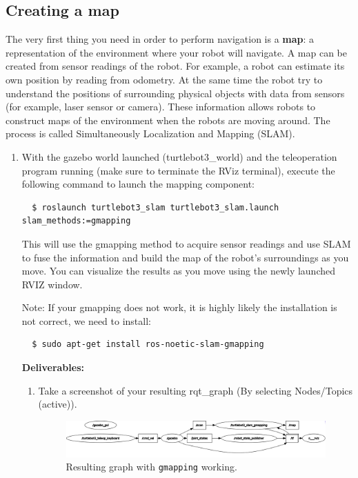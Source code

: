 \documentclass[12pt]{article}
\begin{document}
\subsection{Creating a map}
The very first thing you need in order to perform navigation is a \textbf{map}: a representation of the environment where your robot will navigate. A map can be created from sensor readings of the robot. For example, a robot can estimate its own position by reading from odometry. At the same time the robot try to understand the positions of surrounding physical objects with data from sensors (for example, laser sensor or camera). These information allows robots to construct maps of the environment when the robots are moving around. The process is called Simultaneously Localization and Mapping (SLAM).  

\begin{enumerate}
    \item With the gazebo world launched (turtlebot3\_world) and the teleoperation program running (make sure to terminate the RViz terminal), execute the following command to launch the mapping component:
    \begin{verbatim}
  $ roslaunch turtlebot3_slam turtlebot3_slam.launch slam_methods:=gmapping
    \end{verbatim}
    This will use the gmapping method to acquire sensor readings and use SLAM to fuse the information and build the map of the robot’s surroundings as you move. You can visualize the results as you move using the newly launched RVIZ window.
    
    Note: If your gmapping does not work, it is highly likely the installation is not correct, we need to install:
    \begin{verbatim}
  $ sudo apt-get install ros-noetic-slam-gmapping
    \end{verbatim}
    \textbf{Deliverables:}
    \begin{enumerate}
    \item Take a screenshot of your resulting rqt\_graph (By selecting Nodes/Topics (active)).

    \begin{figure}[H]
      \centering\includegraphics[width=14cm]{images/rosgraph_gmapping.png}\vspace{-10pt}
      \caption{Resulting graph with \texttt{gmapping} working.}\label{fig:gmapping}
      \end{figure}


\end{enumerate}
\end{enumerate}
\end{document}
